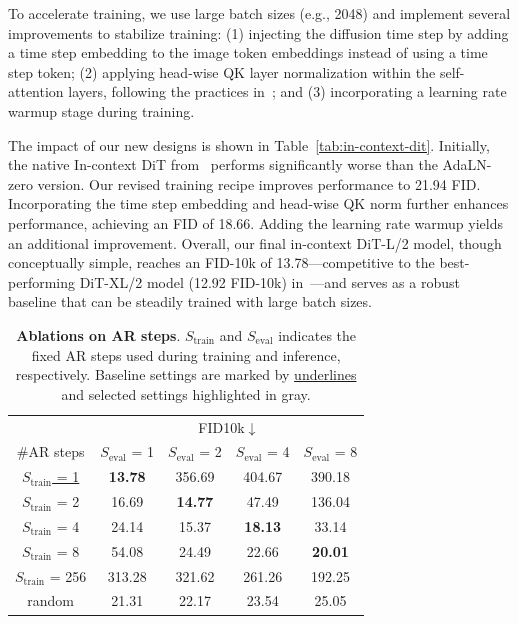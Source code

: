 To accelerate training, we use large batch sizes (e.g., 2048) and implement several improvements to stabilize training: (1) injecting the diffusion time step by adding a time step embedding to the image token embeddings instead of using a time step token; (2) applying head-wise QK layer normalization within the self-attention layers, following the practices in~\cite{dehghani2023vit22b}; and (3) incorporating a learning rate warmup stage during training. 

The impact of our new designs is shown in Table~\ref{tab:in-context-dit}. Initially, the native In-context DiT from~\cite{dit} performs significantly worse than the AdaLN-zero version. Our revised training recipe improves performance to 21.94 FID. Incorporating the time step embedding and head-wise QK norm further enhances performance, achieving an FID of 18.66. Adding the learning rate warmup yields an additional improvement. Overall, our final in-context DiT-L/2 model, though conceptually simple, reaches an FID-10k of 13.78—competitive to the best-performing DiT-XL/2 model (12.92 FID-10k) in~\cite{dit}—and serves as a robust baseline that can be steadily trained with large batch sizes.

\begin{table}[t]
\footnotesize
\centering
\begin{tabular}{c|cccc}
 & \multicolumn{4}{c}{FID10k$\downarrow$} \\ 
\#AR steps  & $S_\text{eval}$ = 1 & $S_\text{eval}$ = 2 & $S_\text{eval}$ = 4 & $S_\text{eval}$ = 8\\ 
\shline
\underline{$S_\text{train}$ = 1} & \textbf{13.78} & 356.69 & 404.67 & 390.18 \\ 
$S_\text{train}$ = 2  & 16.69 & \textbf{14.77} & 47.49 & 136.04 \\
$S_\text{train}$ = 4  & 24.14 & 15.37 & \textbf{18.13} & 33.14\\
$S_\text{train}$ = 8  & 54.08 & 24.49 & 22.66 & \textbf{20.01}  \\
$S_\text{train}$ = 256 & 313.28 & 321.62 & 261.26 & 192.25 \\
\hline
\colorbox{gray!30}{random} & 21.31 & 22.17 & 23.54 & 25.05
\end{tabular}
\caption{\textbf{Ablations on AR steps}. $S_\text{train}$ and $S_\text{eval}$ indicates the fixed AR steps used during training and inference, respectively. Baseline settings are marked by \underline{underlines} and selected settings highlighted in \colorbox{gray!30}{gray}.
\vspace{-10pt}
}
\label{tab:ng}
\end{table}


